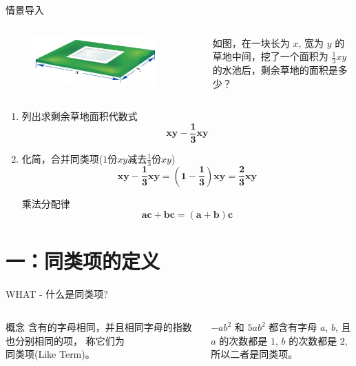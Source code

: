 \documentclass{ctexbeamer}
\begin{document}
\begin{frame}{情景导入}
	\begin{columns}
			\begin{figure}
				\includegraphics[width = 0.9\textwidth]{assets/meadow.png}
			\end{figure}
			\begin{block}{}
			如图，在一块长为 $x$, 宽为 $y$ 的草地中间，挖了一个面积为 $ \frac{1}{3}
			xy $ 的水池后，剩余草地的面积是多少？
			\end{block}
	\end{columns}

	\vspace{0.5cm}
	\begin{enumerate}
		\item<2-> {列出求剩余草地面积代数式}  $$ \bm{xy - \frac{1}{3}xy} $$
		\item<3-> {化简，合并同类项($1$份$xy$减去$\frac{1}{3}$份$xy$)}  
			$$ \bm{xy - \frac{1}{3}xy = (1-\frac{1}{3})xy = \frac{2}{3}xy} $$
			\begin{alertblock}{乘法分配律}
				$$ \bm{ac + bc = (a + b)c} $$
			\end{alertblock}
	\end{enumerate}
\end{frame}

\section{一：同类项的定义}
	\begin{frame}{WHAT - 什么是同类项?}
		\begin{columns}[t]
			\column{0.49\textwidth}
			\begin{alertblock}{概念}
				含有的字母相同，并且相同字母的指数也分别相同的项，
				称它们为\\ \alert{同类项}(Like Term)。
			\end{alertblock}
			
			\column{0.48\textwidth}
			\begin{examples}
				$ -ab^2 $ 和 $ 5ab^2 $ 都含有字母 $ a $, $ b $, 
				且\\ $ a $ 的次数都是 $ 1 $, $ b $ 的次数都是 $ 2 $, 
				所以二者是同类项。
			\end{examples}
		\end{columns}
	\end{frame}
\end{document}
